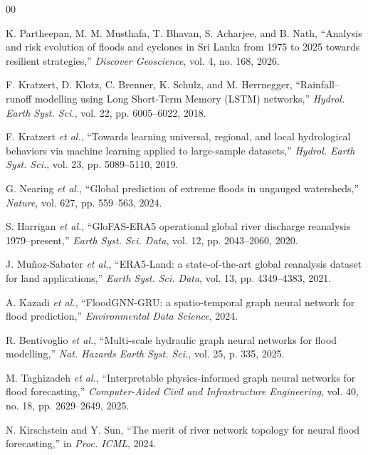\documentclass[conference]{IEEEtran}
\begin{document}
\begin{thebibliography}{00}

 K. Partheepan, M. M. Musthafa, T. Bhavan, S. Acharjee,
and B. Nath, ``Analysis and risk evolution of floods and cyclones in Sri Lanka
from 1975 to 2025 towards resilient strategies,'' \emph{Discover Geoscience},
vol. 4, no. 168, 2026.

 F. Kratzert, D. Klotz, C. Brenner, K. Schulz, and
M. Herrnegger, ``Rainfall--runoff modelling using Long Short-Term Memory (LSTM)
networks,'' \emph{Hydrol. Earth Syst. Sci.}, vol. 22, pp. 6005--6022, 2018.

 F. Kratzert \emph{et al.}, ``Towards learning universal,
regional, and local hydrological behaviors via machine learning applied to
large-sample datasets,'' \emph{Hydrol. Earth Syst. Sci.}, vol. 23,
pp. 5089--5110, 2019.

 G. Nearing \emph{et al.}, ``Global prediction of extreme
floods in ungauged watersheds,'' \emph{Nature}, vol. 627, pp. 559--563, 2024.

 S. Harrigan \emph{et al.}, ``GloFAS-ERA5 operational
global river discharge reanalysis 1979--present,'' \emph{Earth Syst. Sci. Data},
vol. 12, pp. 2043--2060, 2020.

 J. Mu\~{n}oz-Sabater \emph{et al.}, ``ERA5-Land: a
state-of-the-art global reanalysis dataset for land applications,'' \emph{Earth
Syst. Sci. Data}, vol. 13, pp. 4349--4383, 2021.

 A. Kazadi \emph{et al.}, ``FloodGNN-GRU: a spatio-temporal
graph neural network for flood prediction,'' \emph{Environmental Data Science},
2024.

 R. Bentivoglio \emph{et al.}, ``Multi-scale hydraulic
graph neural networks for flood modelling,'' \emph{Nat. Hazards Earth Syst.
Sci.}, vol. 25, p. 335, 2025.

 M. Taghizadeh \emph{et al.}, ``Interpretable
physics-informed graph neural networks for flood forecasting,''
\emph{Computer-Aided Civil and Infrastructure Engineering}, vol. 40, no. 18,
pp. 2629--2649, 2025.

 N. Kirschstein and Y. Sun, ``The merit of river network
topology for neural flood forecasting,'' in \emph{Proc. ICML}, 2024.


\end{thebibliography}
\end{document}
